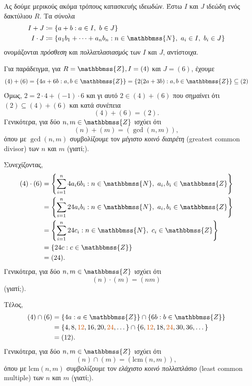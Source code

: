 \documentclass[12pt,a4paper,reqno]{amsart}
\theoremstyle{definition}
\theoremstyle{remark}
\numberwithin{theorem}{section}
\numberwithin{exercise}{section}
\numberwithin{equation}{section}
\newcommand{\NN}{\mathbbmss{N}}
\newcommand{\ZZ}{\mathbbmss{Z}}
\newcommand{\lcm}{\mathrm{lcm}}
\begin{document}
Ας δούμε μερικούς ακόμα τρόπους κατασκευής ιδεωδών. Έστω $I$ και $J$ ιδεώδη ενός δακτύλιου $R$. Τα σύνολα
\begin{align*}
 I + J &\coloneqq \{a + b : a \in I, \ b \in J\} \\
 I\cdot{J} &\coloneqq \{ a_1b_1 + \cdots + a_nb_n : n \in \NN, \ a_i \in I, \ b_i \in J\}
\end{align*}
ονομάζονται \emph{πρόσθεση} και \emph{πολλαπλασιασμός} των $I$ και $J$, αντίστοιχα. 

Για παράδειγμα, για $R = \ZZ, I = (4)$ και $J = (6)$, έχουμε 
\[
(4) + (6) = \{4a + 6b : a, b \in \ZZ\} = \{2(2a + 3b) : a,b \in \ZZ\} \subseteq (2)
\]
Όμως, $2 = 2\cdot{4} + (-1)\cdot{6}$ και γι αυτό $2 \in (4) + (6)$ που σημαίνει ότι $(2) \subseteq (4) + (6)$ και κατά συνέπεια 
\[
(4) + (6) = (2).
\]
Γενικότερα, για δύο $n, m \in \ZZ$ ισχύει ότι 
\[
(n) + (m) = \left(\gcd(n,m)\right),
\]
όπου με $\gcd(n,m)$ συμβολίζουμε τον \emph{μέγιστο κοινό διαιρέτη} (greatest common divisor) των $n$ και $m$ (γιατί;).

Συνεχίζοντας, 
\begin{align*}
(4)\cdot(6) 
&= \left\{ \sum_{i=1}^n 4a_i6b_i : n \in \NN, \ a_i, b_i \in \ZZ\right\} \\
&= \left\{ \sum_{i=1}^n 24a_ib_i : n \in \NN, \ a_i, b_i \in \ZZ\right\} \\
&= \left\{ \sum_{i=1}^n 24c_i : n \in \NN, \ c_i \in \ZZ\right\} \\
&= \left\{ 24c : c \in \ZZ\right\} \\
&= (24).
\end{align*}
Γενικότερα, για δύο $n, m \in \ZZ$ ισχύει ότι 
\[
(n)\cdot(m) = \left(nm\right)
\]
(γιατί;).

Τέλος, 
\begin{align*}
(4)\cap(6) 
&= \{4a : a\in\ZZ\} \cap \{6b : b \in \ZZ\} \\ 
&= \{4, 8, \textcolor{burntorange}{12}, 16, 20, \textcolor{burntorange}{24}, \dots\} \cap \{6, \textcolor{burntorange}{12}, 18, \textcolor{burntorange}{24}, 30, 36, \dots\} \\
&= (12).
\end{align*}
Γενικότερα, για δύο $n, m \in \ZZ$ ισχύει ότι 
\[
(n) \cap (m) = \left(\lcm(n,m)\right),
\]
όπου με $\lcm(n,m)$ συμβολίζουμε τον \emph{ελάχιστο κοινό πολλαπλάσιο} (least common multiple) των $n$ και $m$ (γιατί;).
\end{document}
